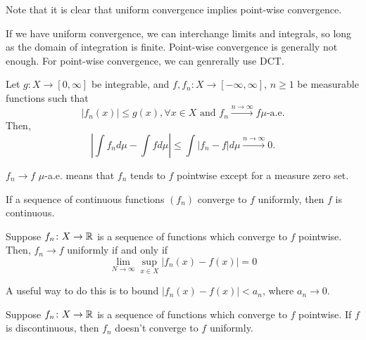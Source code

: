 \begin{remark}
Note that it is clear that uniform convergence implies point-wise convergence.
\end{remark}

\begin{remark}
If we have uniform convergence, we can interchange limits and integrals, 
so long as the domain of integration is finite.
Point-wise convergence is generally not enough. For point-wise convergence, we can 
genrerally use DCT.
\end{remark}

\begin{theorem}
Let $g \colon X \rightarrow [0, \infty]$ be integrable,
and $f, f_n \colon X \rightarrow [-\infty, \infty]$, 
$n \geq 1$ be measurable functions such that 
\[
|f_n(x)| \leq g(x), \forall x \in X \text{ and } f_n \overset{n \rightarrow \infty}{\rightarrow} f \mu\text{-a.e.} 
\]
Then,
\[
\left| \int f_n d\mu - \int f d\mu \right| \leq \int |f_n - f| d\mu \overset{n \rightarrow \infty}{\rightarrow} 0.
\]
\end{theorem}

\begin{remark}
$f_n \rightarrow f$ $\mu$-a.e. means that $f_n$ tends to $f$ pointwise 
except for a measure zero set.
\end{remark}

\begin{proposition}
If a sequence of continuous functions $(f_n)$ converge to $f$ uniformly, then $f$ is continuous.
\end{proposition}

\begin{proposition}
Suppose $f_n \colon X \rightarrow \mathbb{R}$ is a sequence of functions which converge to $f$ pointwise. Then,
$f_n \rightarrow f$ uniformly if and only if 
\[
\lim_{N \rightarrow \infty} \sup_{x \in X} |f_n(x) - f(x)| = 0
\]
\end{proposition}

\begin{remark}
A useful way to do this is to bound $|f_n(x) - f(x)| < a_n$, where 
$a_n \rightarrow 0$.
\end{remark}

\begin{corollary}
Suppose $f_n \colon X \rightarrow \mathbb{R}$ is a sequence of functions which converge to $f$ pointwise. 
If $f$ is discontinuous, then $f_n$ doesn't converge to $f$ uniformly.
\end{corollary}

